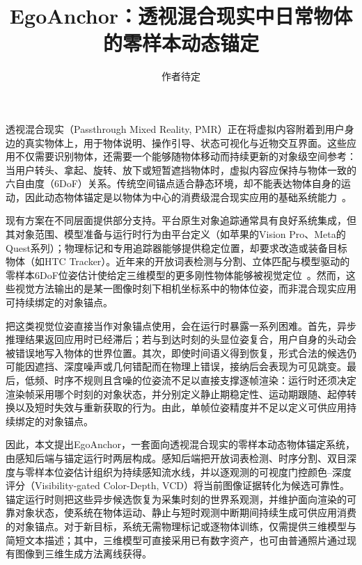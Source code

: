 \documentclass[review]{vgtc}
\title{EgoAnchor：透视混合现实中日常物体的零样本动态锚定}
\author{作者待定}
\begin{document}
\label{sec:introduction}
\maketitle

透视混合现实（Passthrough Mixed Reality, PMR）正在将虚拟内容附着到用户身边的真实物体上，用于物体说明、操作引导、状态可视化与近物交互界面。这些应用不仅需要识别物体，还需要一个能够随物体移动而持续更新的对象级空间参考：当用户转头、拿起、旋转、放下或短暂遮挡物体时，虚拟内容应保持与物体一致的六自由度（6DoF）关系。传统空间锚点适合静态环境，却不能表达物体自身的运动，因此动态物体锚定是以物体为中心的消费级混合现实应用的基础系统能力~\cite{selfblending2026,gradualreality2024}。

现有方案在不同层面提供部分支持。平台原生对象追踪通常具有良好系统集成，但其对象范围、模型准备与运行时行为由平台定义（如苹果的Vision Pro、Meta的Quest系列）；物理标记和专用追踪器能够提供稳定位置，却要求改造或装备目标物体（如HTC Tracker）。近年来的开放词表检测与分割、立体匹配与模型驱动的零样本6DoF位姿估计使给定三维模型的更多刚性物体能够被视觉定位~\cite{groundingdino2025,cutie2024,foundationstereo2025,foundationpose2024,gigapose2024}。然而，这些视觉方法输出的是某一图像时刻下相机坐标系中的物体位姿，而非混合现实应用可持续绑定的对象锚点。

把这类视觉位姿直接当作对象锚点使用，会在运行时暴露一系列困难。首先，异步推理结果返回应用时已经滞后；若与到达时刻的头显位姿复合，用户自身的头动会被错误地写入物体的世界位置。其次，即使时间语义得到恢复，形式合法的候选仍可能因遮挡、深度噪声或几何错配而在物理上错误，接纳后会表现为可见跳变。最后，低频、时序不规则且含噪的位姿流不足以直接支撑逐帧渲染：运行时还须决定渲染帧采用哪个时刻的对象状态，并分别定义静止期稳定性、运动期跟随、起停转换以及短时失效与重新获取的行为。由此，单帧位姿精度并不足以定义可供应用持续绑定的对象锚点。

因此，本文提出EgoAnchor，一套面向透视混合现实的零样本动态物体锚定系统，由感知后端与锚定运行时两层构成。感知后端把开放词表检测、时序分割、双目深度与零样本位姿估计组织为持续感知流水线，并以逐观测的可视度门控颜色--深度评分（Visibility-gated Color-Depth, VCD）将当前图像证据转化为候选可靠性。锚定运行时则把这些异步候选恢复为采集时刻的世界系观测，并维护面向渲染的可靠对象状态，使系统在物体运动、静止与短时观测中断期间持续生成可供应用消费的对象锚点。对于新目标，系统无需物理标记或逐物体训练，仅需提供三维模型与简短文本描述；其中，三维模型可直接采用已有数字资产，也可由普通照片通过现有图像到三维生成方法离线获得。
\end{document}

